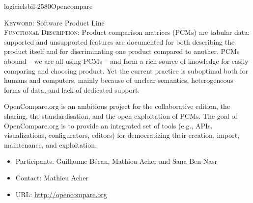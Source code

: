 \documentclass{ra2018}
\begin{document}
 \begin{module}{logiciels}{bil-2580}{Opencompare}

   \textsc{Keyword:} Software Product Line \\ 


   

 \textsc{Functional Description:}  Product comparison matrices (PCMs) are tabular data: supported and unsupported features are documented for both describing the product itself and for discriminating one product compared to another. PCMs abound – we are all using PCMs – and form a rich source of knowledge for easily comparing and choosing product. Yet the current practice is suboptimal both for humans and computers, mainly because of unclear semantics, heterogeneous forms of data, and lack of dedicated support. 

OpenCompare.org is an ambitious project for the collaborative edition, the sharing, the standardisation, and the open exploitation of PCMs. The goal of OpenCompare.org is to provide an integrated set of tools (e.g., APIs, visualizations, configurators, editors) for democratizing their creation, import, maintenance, and exploitation.\\

   \begin{itemize}
      \item Participants: Guillaume Bécan, Mathieu Acher and Sana Ben Nasr
      \item Contact: Mathieu Acher
      \item URL: \url{http://opencompare.org}
   \end{itemize}

 \end{module}
\end{document}
